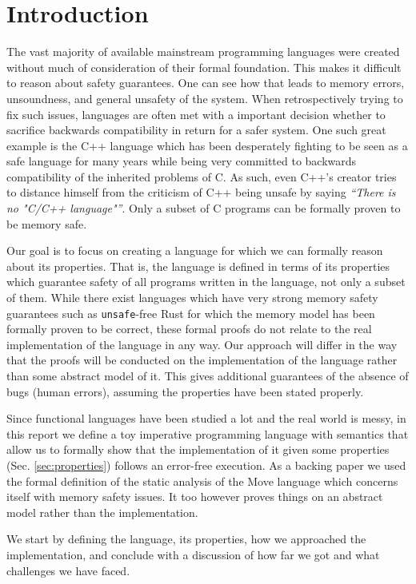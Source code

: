\section{Introduction}

The vast majority of available mainstream programming languages were created without much of consideration of their formal foundation. This makes it difficult to reason about safety guarantees. One can see how that leads to memory errors, unsoundness, and general unsafety of the system. When retrospectively trying to fix such issues, languages are often met with a important decision whether to sacrifice backwards compatibility in return for a safer system. One such great example is the C++ language which has been desperately fighting to be seen as a safe language for many years while being very committed to backwards compatibility of the inherited problems of C. As such, even C++'s creator tries to distance himself from the criticism of C++ being unsafe by saying \textit{``There is no "C/C++ language"''}\cite{bjarne2023}. Only a subset of C programs can be formally proven to be memory safe.

Our goal is to focus on creating a language for which we can formally reason about its properties. That is, the language is defined in terms of its properties which guarantee safety of all programs written in the language, not only a subset of them. While there exist languages which have very strong memory safety guarantees such as \texttt{unsafe}-free Rust for which the memory model has been formally proven to be correct\cite{10.1145/3158154}, these formal proofs do not relate to the real implementation of the language in any way. Our approach will differ in the way that the proofs will be conducted on the implementation of the language rather than some abstract model of it. This gives additional guarantees of the absence of bugs (human errors), assuming the properties have been stated properly.

Since functional languages have been studied a lot and the real world is messy, in this report we define a toy imperative programming language with semantics that allow us to formally show that the implementation of it given some properties (Sec. \ref{sec:properties}) follows an error-free execution. As a backing paper we used the formal definition of the static analysis of the Move language\cite{blackshear2022borrow} which concerns itself with memory safety issues. It too however proves things on an abstract model rather than the implementation.

We start by defining the language, its properties, how we approached the implementation, and conclude with a discussion of how far we got and what challenges we have faced.
